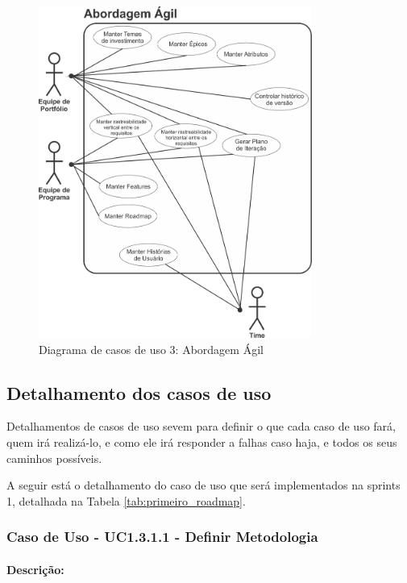 \begin{figure}[H]
	\centering
	\includegraphics[width=0.8\textwidth]{imgModelagem/DiagramaUC3}
	\caption{Diagrama de casos de uso 3: Abordagem Ágil}
	\label{img:DiagramaUC3}
\end{figure}

\subsection{Detalhamento dos casos de uso}

Detalhamentos de casos de uso sevem para definir o que cada caso de uso fará, quem irá realizá-lo, e como ele irá responder a falhas caso haja, e todos os seus caminhos possíveis.

A seguir está o detalhamento do caso de uso que será implementados na sprints 1, detalhada na Tabela \ref{tab:primeiro_roadmap}.

\subsubsection{Caso de Uso - UC1.3.1.1 - Definir Metodologia}

\paragraph{Descrição:}

